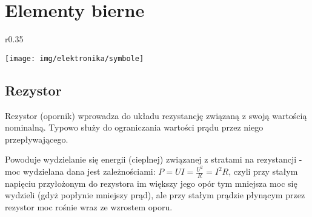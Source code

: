 % 
% 
% 
% 

\section{Elementy bierne}

\begin{wrapfigure}{r}{0.35\textwidth}
  \begin{center}
    \vspace{-40pt}
    \texttt{[image: img/elektronika/symbole]}
    \vspace{-20pt}
  \end{center}
\end{wrapfigure}

\subsection{Rezystor}

Rezystor (opornik) wprowadza do układu rezystancję związaną z swoją wartością nominalną. Typowo służy do ograniczania wartości prądu przez niego przepływającego.

Powoduje wydzielanie się energii (cieplnej) związanej z stratami na rezystancji - moc wydzielana dana jest zależnościami: $P = UI = \frac{U^2}{R} = I^2R$, czyli przy stałym napięciu przyłożonym do rezystora im większy jego opór tym mniejsza moc się wydzieli (gdyż popłynie mniejszy prąd), ale przy stałym prądzie płynącym przez rezystor moc rośnie wraz ze wzrostem oporu.

